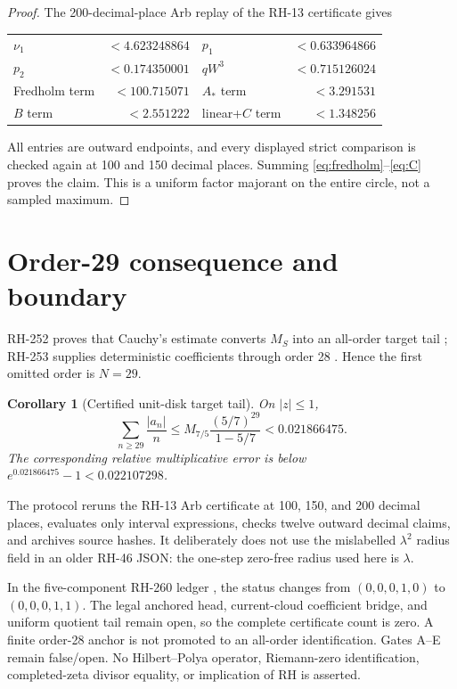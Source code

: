 \documentclass[11pt]{article}
\newtheorem{corollary}[theorem]{Corollary}
\theoremstyle{remark}
\begin{document}
\begin{proof}
The 200-decimal-place Arb replay of the RH-13 certificate gives
\begin{center}
\small
\begin{tabular}{lr@{\qquad}lr}
\toprule
$\nu_1$ & $<4.623248864$ & $p_1$ & $<0.633964866$\\
$p_2$ & $<0.174350001$ & $qW^3$ & $<0.715126024$\\
Fredholm term & $<100.715071$ & $A_*$ term & $<3.291531$\\
$B$ term & $<2.551222$ & linear+$C$ term & $<1.348256$\\
\bottomrule
\end{tabular}
\end{center}
All entries are outward endpoints, and every displayed strict comparison is
checked again at 100 and 150 decimal places.  Summing
\eqref{eq:fredholm}--\eqref{eq:C} proves the claim.  This is a uniform
factor majorant on the entire circle, not a sampled maximum.
\end{proof}

\section{Order-29 consequence and boundary}

RH-252 proves that Cauchy's estimate converts $M_S$ into an all-order target
tail \citep{WangRH252}; RH-253 supplies deterministic coefficients through
order 28 \citep{WangRH253}.  Hence the first omitted order is $N=29$.

\begin{corollary}[Certified unit-disk target tail]
On $|z|\le1$,
\[
 \sum_{n\ge29}\frac{|a_n|}{n}
 \le M_{7/5}\frac{(5/7)^{29}}{1-5/7}
 <0.021866475.
\]
The corresponding relative multiplicative error is below
$e^{0.021866475}-1<0.022107298$.
\end{corollary}

The protocol reruns the RH-13 Arb certificate at 100, 150, and 200 decimal
places, evaluates only interval expressions, checks twelve outward decimal
claims, and archives source hashes.  It deliberately does not use the
mislabelled $\lambda^2$ radius field in an older RH-46 JSON: the one-step
zero-free radius used here is $\lambda$.

In the five-component RH-260 ledger \citep{WangRH260}, the status changes
from $(0,0,0,1,0)$ to $(0,0,0,1,1)$.  The legal anchored head, current-cloud
coefficient bridge, and uniform quotient tail remain open, so the complete
certificate count is zero.  A finite order-28 anchor is not promoted to an
all-order identification.  Gates A--E remain false/open.  No Hilbert--Polya
operator, Riemann-zero identification, completed-zeta divisor equality, or
implication of RH is asserted.



\end{document}
